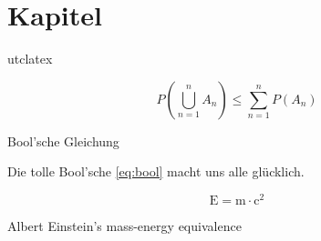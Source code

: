 





\frontmatter




\blankpage


\setcounter{page}{-1}
\thispagestyle{empty}



\clearpage




\clearpage




\clearpage






\mainmatter

\chapter{Kapitel}\label{chap:first}

\lipsum[1-5]\parencite{biblatex}\acrshort{utc}\gls{latex}

\begin{mycapequ}[!ht]
    \begin{equation}
        {P(\bigcup_{n=1}^n A_n) \leq \sum_{n=1}^n P(A_n)}
        \label{eq:bool} %
    \end{equation}
    \caption{Bool'sche Gleichung}
\end{mycapequ}

\noindent Die tolle Bool'sche \cref{eq:bool} macht uns alle glücklich.

\begin{mycapequ}[!ht]
    \begin{equation}
        \mathrm{E=m\cdot c^2}
        \label{eq:meequi} %
    \end{equation}
    \caption{Albert Einstein's mass-energy equivalence}
\end{mycapequ}

